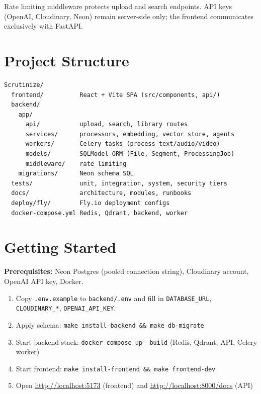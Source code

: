 \documentclass[10pt,a4paper]{article}
\begin{document}
Rate limiting middleware protects upload and search endpoints. API keys (OpenAI, Cloudinary, Neon) remain server-side only; the frontend communicates exclusively with FastAPI.

\section{Project Structure}

\begin{verbatim}
Scrutinize/
  frontend/          React + Vite SPA (src/components, api/)
  backend/
    app/
      api/           upload, search, library routes
      services/      processors, embedding, vector store, agents
      workers/       Celery tasks (process_text/audio/video)
      models/        SQLModel ORM (File, Segment, ProcessingJob)
      middleware/    rate limiting
    migrations/      Neon schema SQL
  tests/             unit, integration, system, security tiers
  docs/              architecture, modules, runbooks
  deploy/fly/        Fly.io deployment configs
  docker-compose.yml Redis, Qdrant, backend, worker
\end{verbatim}

\section{Getting Started}

\textbf{Prerequisites:} Neon Postgres (pooled connection string), Cloudinary account, OpenAI API key, Docker.

\begin{enumerate}
  \item Copy \texttt{.env.example} to \texttt{backend/.env} and fill in \texttt{DATABASE\_URL}, \texttt{CLOUDINARY\_*}, \texttt{OPENAI\_API\_KEY}.
  \item Apply schema: \texttt{make install-backend \&\& make db-migrate}
  \item Start backend stack: \texttt{docker compose up --build} (Redis, Qdrant, API, Celery worker)
  \item Start frontend: \texttt{make install-frontend \&\& make frontend-dev}
  \item Open \url{http://localhost:5173} (frontend) and \url{http://localhost:8000/docs} (API)
\end{enumerate}
\end{document}
